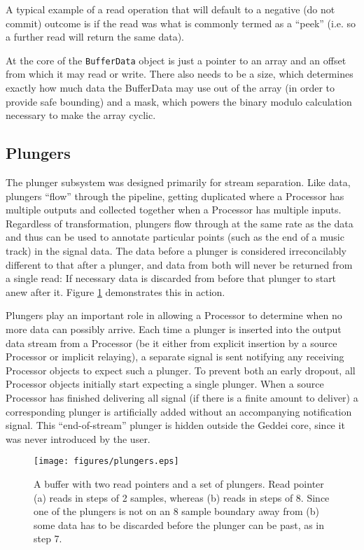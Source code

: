 A typical example of a read operation that will default to a negative (do not commit) outcome is if the read was what is commonly termed as a ``peek'' (i.e. so a further read will return the same data).

At the core of the \texttt{BufferData} object is just a pointer to an array and an offset from which it may read or write. There also needs to be a size, which determines exactly how much data the BufferData may use out of the array (in order to provide safe bounding) and a mask, which powers the binary modulo calculation necessary to make the array cyclic.

\subsection{Plungers}\label{sec:plungers}

The plunger subsystem was designed primarily for stream separation. Like data, plungers ``flow'' through the pipeline, getting duplicated where a Processor has multiple outputs and collected together when a Processor has multiple inputs. Regardless of transformation, plungers flow through at the same rate as the data and thus can be used to annotate particular points (such as the end of a music track) in the signal data. The data before a plunger is considered irreconcilably different to that after a plunger, and data from both will never be returned from a single read: If necessary data is discarded from before that plunger to start anew after it. Figure \ref{fig:plungers} demonstrates this in action.

Plungers play an important role in allowing a Processor to determine when no more data can possibly arrive. Each time a plunger is inserted into the output data stream from a Processor (be it either from explicit insertion by a source Processor or implicit relaying), a separate signal is sent notifying any receiving Processor objects to expect such a plunger. To prevent both an early dropout, all Processor objects initially start expecting a single plunger. When a source Processor has finished delivering all signal (if there is a finite amount to deliver) a corresponding plunger is artificially added without an accompanying notification signal. This ``end-of-stream'' plunger is hidden outside the Geddei core, since it was never introduced by the user.

\begin{figure}[ht!]
\centering
\texttt{[image: figures/plungers.eps]}
\caption{A buffer with two read pointers and a set of plungers. Read pointer (a) reads in steps of 2 samples, whereas (b) reads in steps of 8. Since one of the plungers is not on an 8 sample boundary away from (b) some data has to be discarded before the plunger can be past, as in step 7.}
\label{fig:plungers}
\end{figure}

